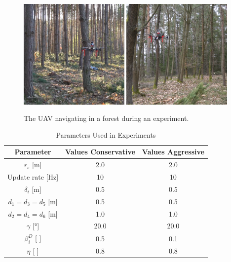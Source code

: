             \begin{figure}[htbp]
                \centering
                \includegraphics[width=0.48\textwidth]{./fig/photos/pic1.png}
                \includegraphics[width=0.48\textwidth]{./fig/photos/pic2.png}
                \caption{
                    The \ac{UAV} navigating in a forest during an experiment. 
                }
                \label{fig:real_wrld_pics}
            \end{figure}

            \begin{table}[H]
                \centering
                \caption{Parameters Used in Experiments}
                \begin{tabular}{|c|c|c|}
                    \hline
                    Parameter & Values Conservative & Values Aggressive \\
                    \hline
                    $r_s$ [m] & 2.0 & 2.0 \\ \hline
                    Update rate [Hz] & 10 & 10 \\ \hline
                    $\delta_i$ [m] & 0.5 & 0.5  \\ \hline
                    $d_1 = d_3 = d_5$ [m] & 0.5 & 0.5  \\ \hline
                    $d_2 = d_4 = d_6$ [m] & 1.0 & 1.0 \\ \hline
                    $\gamma$ [°] & 20.0 & 20.0 \\ \hline
                    $\beta_i^D$ [ ] & 0.5 & 0.1 \\ \hline
                    $\eta$ [ ] & 0.8 & 0.8 \\ \hline
                \end{tabular}
                \label{tab:rbl_forest_conservative_flight}
            \end{table}

